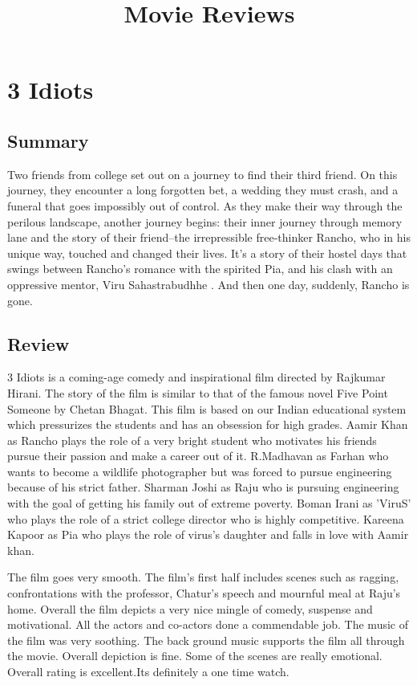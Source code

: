\documentclass[11pt]{article} %
\title{Movie Reviews}
\author{}
\begin{document}
\maketitle

\section{3 Idiots}
\subsection{Summary}
Two friends from college set out on a journey to find their third friend. On this journey, they encounter a long forgotten bet, a wedding they must crash, and a funeral that goes impossibly out of control. As they make their way through the perilous landscape, another journey begins: their inner journey through memory lane and the story of their friend--the irrepressible free-thinker Rancho, who in his unique way, touched and changed their lives. It’s a story of their hostel days that swings between Rancho’s romance with the spirited Pia, and his clash with an oppressive mentor, Viru Sahastrabudhhe . And then one day, suddenly, Rancho is gone.

\subsection{Review}
3 Idiots is a coming-age comedy and inspirational film directed by Rajkumar Hirani. The story of the film is similar to that of the famous novel Five Point Someone by Chetan Bhagat. This film is based on our Indian educational system which pressurizes the students and has an obsession for high grades.  Aamir Khan as Rancho plays the role of a very bright student who motivates his friends pursue their passion and make a career out of it. R.Madhavan as Farhan who wants to become a wildlife photographer but was forced to pursue engineering because of his strict father. Sharman Joshi as Raju who is pursuing engineering with the goal of getting his family out of extreme poverty. Boman Irani as 'ViruS' who plays the role of a strict college director who is highly competitive. Kareena Kapoor as Pia who plays the role of virus’s daughter and falls in love with Aamir khan.

The film goes very smooth. The film’s first half includes scenes such as ragging, confrontations with the professor, Chatur’s speech and mournful meal at Raju’s home. Overall the film depicts a very nice mingle of comedy, suspense and motivational. All the actors and co-actors done a commendable job. The music of the film was very soothing. The back ground music supports the film all through the movie. Overall depiction is fine. Some of the scenes are really emotional. Overall rating is excellent.Its definitely a one time watch.
\end{document}
